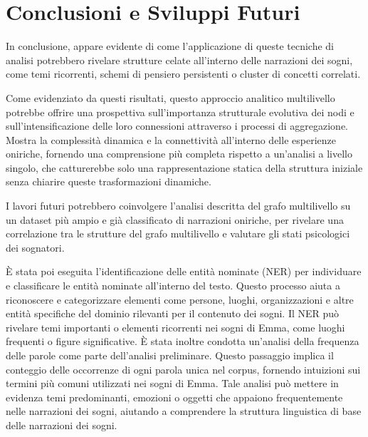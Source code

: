 \chapter*{Conclusioni e Sviluppi Futuri}


In conclusione, appare evidente di come l'applicazione di queste
tecniche di analisi potrebbero rivelare strutture celate all'interno delle narrazioni dei sogni, come temi ricorrenti,
schemi di pensiero persistenti o cluster di concetti correlati.

Come evidenziato da questi risultati, questo approccio analitico multilivello potrebbe offrire una prospettiva
sull'importanza strutturale evolutiva dei nodi e sull'intensificazione delle loro connessioni attraverso i processi di
aggregazione.
Mostra la complessità dinamica e la connettività all'interno delle esperienze oniriche, fornendo una comprensione più
completa rispetto a un'analisi a livello singolo, che catturerebbe solo una rappresentazione statica della struttura
iniziale senza chiarire queste trasformazioni dinamiche.

I lavori futuri potrebbero coinvolgere l'analisi descritta del grafo multilivello su un dataset più ampio e già
classificato di narrazioni oniriche, per rivelare una correlazione tra le strutture del grafo multilivello e valutare
gli stati psicologici dei sognatori.

È stata poi eseguita l'identificazione delle entità nominate (NER) per individuare e classificare le entità nominate
all'interno del testo. Questo processo aiuta a riconoscere e categorizzare elementi come persone, luoghi,
organizzazioni e altre entità specifiche del dominio rilevanti per il contenuto dei sogni. Il NER può rivelare
temi importanti o elementi ricorrenti nei sogni di Emma, come luoghi frequenti o figure significative.
È stata inoltre condotta un'analisi della frequenza delle parole come parte dell'analisi preliminare.
Questo passaggio implica il conteggio delle occorrenze di ogni parola unica nel corpus, fornendo intuizioni sui
termini più comuni utilizzati nei sogni di Emma. Tale analisi può mettere in evidenza temi predominanti, emozioni o
oggetti che appaiono frequentemente nelle narrazioni dei sogni, aiutando a comprendere la struttura linguistica
di base delle narrazioni dei sogni.